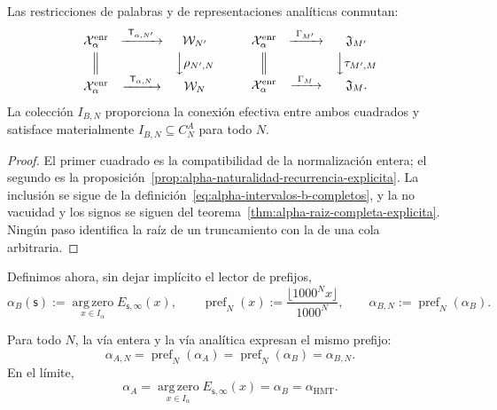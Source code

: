 \begin{proposition}
\label{prop:alpha-cuadrados-compatibilidad}
Las restricciones de palabras y de representaciones analíticas conmutan:
\[
\begin{array}{ccc}
 \mathcal X_\alpha^{\mathrm{enr}}&
 \xrightarrow{\ \mathsf T_{\alpha,N'}\ }&\mathcal W_{N'}\\[1mm]
 \Big\Vert&&\Big\downarrow\rho_{N',N}\\[1mm]
 \mathcal X_\alpha^{\mathrm{enr}}&
 \xrightarrow{\ \mathsf T_{\alpha,N}\ }&\mathcal W_N
\end{array}
\qquad
\begin{array}{ccc}
 \mathcal X_\alpha^{\mathrm{enr}}&
 \xrightarrow{\ \Gamma_{M'}\ }&\mathfrak J_{M'}\\[1mm]
 \Big\Vert&&\Big\downarrow\tau_{M',M}\\[1mm]
 \mathcal X_\alpha^{\mathrm{enr}}&
 \xrightarrow{\ \Gamma_M\ }&\mathfrak J_M .
\end{array}
\]
La colección \(I_{B,N}\) proporciona la conexión efectiva entre ambos
cuadrados y satisface materialmente
\(I_{B,N}\subseteq C_N^A\) para todo \(N\).
\end{proposition}

\begin{proof}
El primer cuadrado es la compatibilidad de la normalización entera; el segundo
es la proposición~\ref{prop:alpha-naturalidad-recurrencia-explicita}. La
inclusión se sigue de la definición~\eqref{eq:alpha-intervalos-b-completos},
y la no vacuidad y los signos se siguen del
teorema~\ref{thm:alpha-raiz-completa-explicita}. Ningún paso identifica la
raíz de un truncamiento con la de una cola arbitraria.
\end{proof}

Definimos ahora, sin dejar implícito el lector de prefijos,
\begin{equation}
 \alpha_B(\mathsf s):=
 \operatorname*{arg\,zero}_{x\in I_\alpha}E_{\mathsf s,\infty}(x),
 \qquad
 \operatorname{pref}_N(x):=
 \frac{\lfloor1000^Nx\rfloor}{1000^N},
 \qquad
 \alpha_{B,N}:=\operatorname{pref}_N(\alpha_B).
 \label{eq:alpha-definicion-b-y-prefijos-rev08}
\end{equation}

\begin{theorem}
\label{prop:alpha-dos-limites}
Para todo \(N\), la vía entera y la vía analítica expresan el mismo prefijo:
\begingroup
\renewcommand{\theequation}{A7\(_0\)}
\begin{equation}
 \boxed{\alpha_{A,N}=\operatorname{pref}_N(\alpha_A)
 =\operatorname{pref}_N(\alpha_B)=\alpha_{B,N}.}
 \label{eq:alpha-dos-vias-cada-nivel}
\end{equation}
\endgroup
En el límite,
\begingroup
\renewcommand{\theequation}{A8\(_0\)}
\begin{equation}
 \boxed{\alpha_A
 =\operatorname*{arg\,zero}_{x\in I_\alpha}
       E_{\mathsf s,\infty}(x)
 =\alpha_B=\alpha_{\mathrm{HMT}}.}
 \label{eq:alpha-dos-vias-limite-coinductivo}
\end{equation}
\endgroup
\end{theorem}

